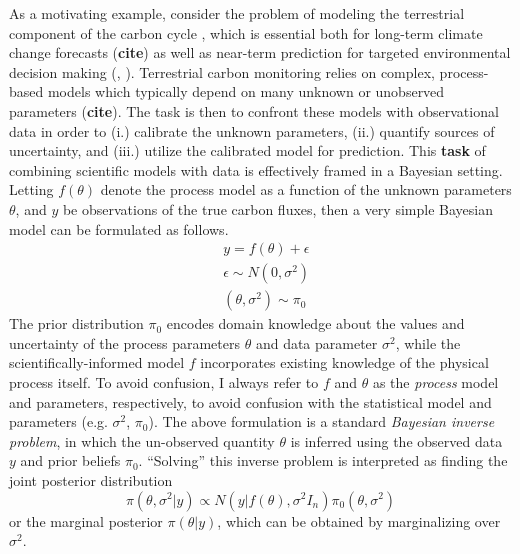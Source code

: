 \documentclass[12pt]{article}
\begin{document}
As a motivating example, consider
the problem of modeling the terrestrial component of the carbon cycle \cite{Firedlingstein}, which is essential both for long-term climate change forecasts (\textbf{cite}) as well as near-term
prediction for targeted environmental decision making (\cite{Dietze}, \cite{Cayelan}). Terrestrial carbon monitoring relies on complex, process-based models which typically depend on many
unknown or unobserved parameters (\textbf{cite}). The task is then to confront these models with observational data in order to (i.) calibrate the unknown parameters, (ii.) quantify sources of 
uncertainty, and (iii.) utilize the calibrated model for prediction. This \textbf{task} of combining scientific models with data is effectively framed in a Bayesian setting. Letting $f(\theta)$ denote the process model as a function of the unknown parameters $\theta$, and $y$ be observations of the true carbon fluxes, then a very simple Bayesian model can be formulated as follows.
\begin{align*}
&y = f(\theta) + \epsilon \\
&\epsilon \sim N(0, \sigma^2) \\
&(\theta, \sigma^2) \sim \pi_0
\end{align*}
The prior distribution $\pi_0$ encodes domain knowledge about the values and uncertainty of the process parameters $\theta$ and data parameter $\sigma^2$, 
while the scientifically-informed model $f$ incorporates existing knowledge of the physical process itself. To avoid confusion, I always refer to $f$ and $\theta$ as the 
\textit{process} model and parameters, respectively, to avoid confusion with the statistical model and parameters (e.g. $\sigma^2$, $\pi_0$). The above 
formulation is a standard \textit{Bayesian inverse problem}, in which the un-observed quantity $\theta$ is inferred using the observed data $y$ and prior 
beliefs $\pi_0$. ``Solving'' this inverse problem is interpreted as finding the joint posterior distribution
\[\pi(\theta, \sigma^2|y) \propto N(y|f(\theta), \sigma^2 I_n)\pi_0(\theta, \sigma^2)\]
or the marginal posterior $\pi(\theta|y)$, which can be obtained by marginalizing over $\sigma^2$. 
\end{document}
